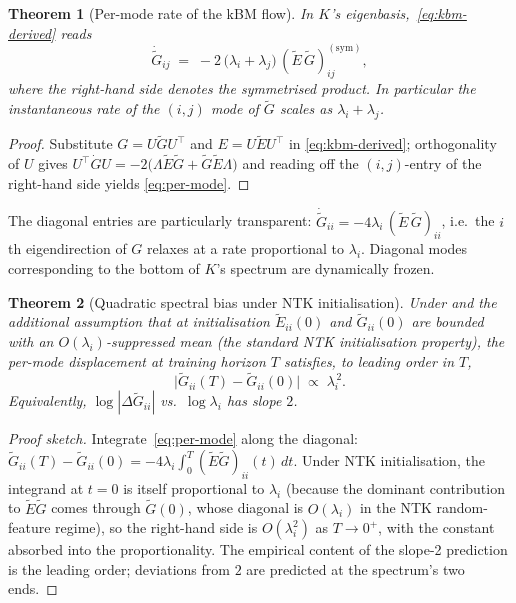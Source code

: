 \documentclass[11pt]{article}
\newtheorem{theorem}{Theorem}
\theoremstyle{definition}
\theoremstyle{plain}
\begin{document}
\begin{theorem}[Per-mode rate of the kBM flow]
\label{thm:per-mode}
In $K$'s eigenbasis,~\eqref{eq:kbm-derived} reads
\begin{equation}
\label{eq:per-mode}
   \dot{\widetilde G}_{ij} \;=\; -2\,\bigl(\lambda_i+\lambda_j\bigr)\,(\widetilde E\,\widetilde G)^{(\mathrm{sym})}_{ij},
\end{equation}
where the right-hand side denotes the symmetrised product. In particular the
instantaneous rate of the $(i,j)$ mode of $\widetilde G$ scales as $\lambda_i+\lambda_j$.
\end{theorem}

\begin{proof}
Substitute $G=U\widetilde G U^\top$ and $E=U\widetilde E U^\top$ in
\eqref{eq:kbm-derived}; orthogonality of $U$ gives
$U^\top \dot G U = -2\bigl(\Lambda \widetilde E \widetilde G + \widetilde G \widetilde E\Lambda\bigr)$
and reading off the $(i,j)$-entry of the right-hand side yields
\eqref{eq:per-mode}.
\end{proof}

The diagonal entries are particularly transparent:
$\dot{\widetilde G}_{ii}=-4\lambda_i\,(\widetilde E\,\widetilde G)_{ii}$,
i.e.\ the $i$th eigendirection of $G$ relaxes at a rate proportional to
$\lambda_i$. Diagonal modes corresponding to the bottom of $K$'s spectrum
are dynamically frozen.

\begin{theorem}[Quadratic spectral bias under NTK initialisation]
\label{thm:spectral-bias}
Under  and the additional assumption that at initialisation
$\widetilde E_{ii}(0)$ and $\widetilde G_{ii}(0)$ are bounded with an
$O(\lambda_i)$-suppressed mean (the standard NTK initialisation property),
the per-mode displacement at training horizon $T$ satisfies, to leading order in $T$,
\begin{equation}
\label{eq:slope2}
   \bigl\lvert\widetilde G_{ii}(T)-\widetilde G_{ii}(0)\bigr\rvert \;\propto\; \lambda_i^{\,2}.
\end{equation}
Equivalently, $\log|\Delta\widetilde G_{ii}|$ vs.\ $\log\lambda_i$ has slope $2$.
\end{theorem}

\begin{proof}[Proof sketch]
Integrate~\eqref{eq:per-mode} along the diagonal:
\(
   \widetilde G_{ii}(T)-\widetilde G_{ii}(0) = -4\lambda_i\int_0^T (\widetilde E\widetilde G)_{ii}(t)\,dt.
\)
Under NTK initialisation, the integrand at $t=0$ is itself proportional to
$\lambda_i$ (because the dominant contribution to $\widetilde E\widetilde G$
comes through $\widetilde G(0)$, whose diagonal is $O(\lambda_i)$ in the
NTK random-feature regime), so the right-hand side is $O(\lambda_i^2)$ as
$T\to0^+$, with the constant absorbed into the proportionality. The empirical
content of the slope-2 prediction is the leading order; deviations from $2$
are predicted at the spectrum's two ends.
\end{proof}
\end{document}
